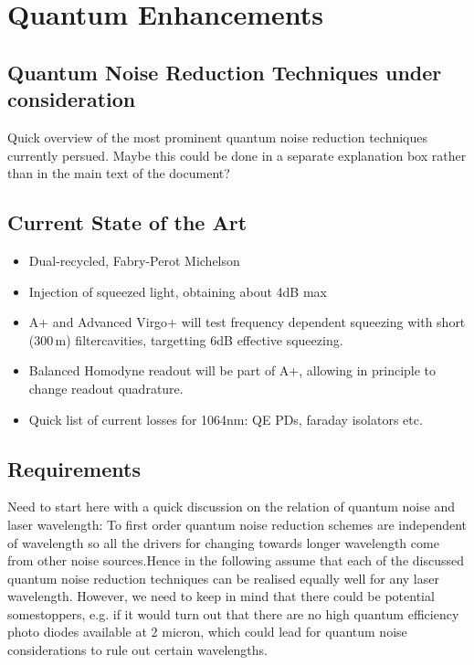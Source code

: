 \section{Quantum Enhancements}
\subsection{Quantum Noise Reduction Techniques under consideration}
Quick overview of the most prominent quantum noise reduction techniques currently persued. Maybe this could be done in a separate explanation box rather 
than in the main text of the document?
\subsection{Current State of the Art}
\begin{itemize}
\item Dual-recycled, Fabry-Perot Michelson
\item Injection of squeezed light, obtaining about 4dB max
\item A+ and Advanced Virgo+ will test frequency dependent squeezing with short (300\,m) filtercavities, targetting 6dB effective squeezing.
\item Balanced Homodyne readout will be part of A+, allowing in principle to change readout quadrature.
\item Quick list of current losses for 1064nm: QE PDs, faraday isolators etc.
\end{itemize}
\subsection{Requirements}
Need to start here with a quick discussion on the relation of quantum noise 
and laser wavelength: To first order quantum noise reduction schemes are independent of wavelength so all the drivers for changing towards longer wavelength come from other noise sources.Hence in the following assume that each of the discussed quantum noise reduction techniques can be realised equally well for any laser wavelength. However, we need to keep in mind that there could 
be potential somestoppers, e.g. if it would turn out that there are no high 
quantum efficiency photo diodes available at 2 micron, which could lead for quantum noise considerations to rule out certain wavelengths.  

